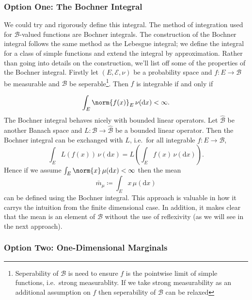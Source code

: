 \documentclass[fontsize=12pt, DIV=10]{scrreprt}
\theoremstyle{remark}
\newcommand{\defeq}{\coloneqq}
\newcommand{\calB}{\mathcal B}
\newcommand{\calE}{\mathcal E}
\newcommand{\dif}[1]{\text{d} #1}
\begin{document}
\subsubsection{Option One: The Bochner Integral}

We could try and rigorously define this integral. The method of integration used for $\calB$-valued functions are Bochner integrals. The construction of the Bochner integral follows the same method as the Lebesgue integral; we define the integral for a class of simple functions and extend the integral by approximation. Rather than going into details on the construction, we'll list off some of the properties of the Bochner integral. Firstly let $(E, \calE, \nu)$ be a probability space and $f: E \to \calB$ be measurable and $\calB$ be seperable\footnote{Seperability of $\calB$ is need to ensure $f$ is the pointwise limit of simple functions, i.e.\ strong measurablity. If we take strong measurability as an additional assumption on $f$ then seperability of $\calB$ can be relaxed}. Then $f$ is integrable if and only if

\begin{equation}
	\int_E \norm{f(x)}_E \, \nu(\dif x) < \infty.
\end{equation}
The Bochner integral behaves nicely with bounded linear operators. Let $\hat{\calB}$ be another Banach space and $L: \calB \to \hat{\calB}$ be a bounded linear operator. Then the Bochner integral can be exchanged with $L$, i.e.\ for all integrable $f: E \to \calB$,
\begin{equation}
	\int_E L(f(x)) \, \nu(\dif x) = L\left( \int_E f(x) \, \nu(\dif x)\right).
\end{equation}
Hence if we assume $\int_E \norm{x} \, \mu(\dif x) < \infty$ then the mean
\begin{equation}
	\bar{m}_{\mu} \defeq \int_E x \, \mu(\dif x)
\end{equation}
can be defined using the Bochner integral. This approach is valuable in how it carrys the intuition from the finite dimensional case. In addition, it makes clear that the mean is an element of $\calB$ without the use of reflexivity (as we will see in the next approach). 

\subsubsection{Option Two: One-Dimensional Marginals}
\end{document}
